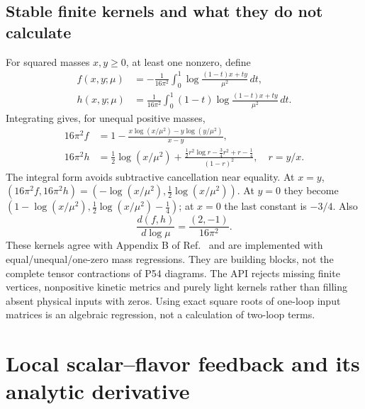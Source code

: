 \documentclass[11pt]{article}
\begin{document}
\subsection{Stable finite kernels and what they do not calculate}
For squared masses $x,y\geq0$, at least one nonzero, define
\begin{align}
 f(x,y;\mu)&=-\frac1{16\pi^2}\int_0^1
 \log\frac{(1-t)x+ty}{\mu^2}\,dt,\\
 h(x,y;\mu)&=\frac1{16\pi^2}\int_0^1(1-t)
 \log\frac{(1-t)x+ty}{\mu^2}\,dt.
\end{align}
Integrating gives, for unequal positive masses,
\begin{align}
16\pi^2 f&=1-\frac{x\log(x/\mu^2)-y\log(y/\mu^2)}{x-y},\\
16\pi^2 h&=\frac12\log(x/\mu^2)
 +\frac{\frac12r^2\log r-\frac34r^2+r-\frac14}{(1-r)^2},\quad r=y/x.
\end{align}
The integral form avoids subtractive cancellation near equality. At
$x=y$, $(16\pi^2f,16\pi^2h)=(-\log(x/\mu^2),\frac12\log(x/\mu^2))$.
At $y=0$ they become
$(1-\log(x/\mu^2),\frac12\log(x/\mu^2)-\frac14)$; at $x=0$ the last
constant is $-3/4$. Also
\begin{equation}
 \frac{d(f,h)}{d\log\mu}=\frac{(2,-1)}{16\pi^2}.
\end{equation}
These kernels agree with Appendix B of Ref.~\cite{PatelShukla} and are
implemented with equal/unequal/one-zero mass regressions. They are building
blocks, not the complete tensor contractions of P54 diagrams. The API
rejects missing finite vertices, nonpositive kinetic metrics and purely
light kernels rather than filling absent physical inputs with zeros.
Using exact square roots of one-loop input matrices is an algebraic
regression, not a calculation of two-loop terms.

\section{Local scalar--flavor feedback and its analytic derivative}
\end{document}
